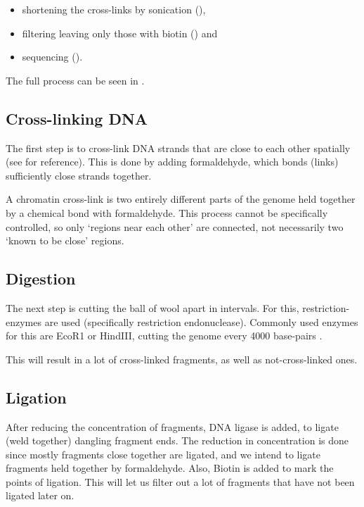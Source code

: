 \begin{itemize}
    \item shortening the cross-links by sonication (),
    \item filtering leaving only those with biotin () and
    \item sequencing ().
\end{itemize}

The full process can be seen in .

\subsection{Cross-linking DNA}\label{sec:crosslinking}

The first step is to cross-link DNA strands that are close to each other
spatially (see  for reference). This is done by adding
formaldehyde, which bonds (links) sufficiently close strands together.

A chromatin cross-link is two entirely different parts of the genome held
together by a chemical bond with formaldehyde. This process cannot be
specifically controlled, so only `regions near each other' are connected, not
necessarily two `known to be close' regions.

\subsection{Digestion}\label{sec:digestion}

The next step is cutting the ball of wool apart in intervals. For this,
restriction-enzymes are used (specifically restriction endonuclease). Commonly
used enzymes for this are EcoR1 or HindIII, cutting the genome every 4000 base-pairs
.

This will result in a lot of cross-linked fragments, as well as not-cross-linked ones.

\subsection{Ligation}\label{sec:ligation}

After reducing the concentration of fragments, DNA ligase is added, to ligate
(weld together) dangling fragment ends. The reduction in concentration is done
since mostly fragments close together are ligated, and we intend to ligate
fragments held together by formaldehyde. Also, Biotin is added to mark the
points of ligation. This will let us filter out a lot of fragments that have
not been ligated later on.



